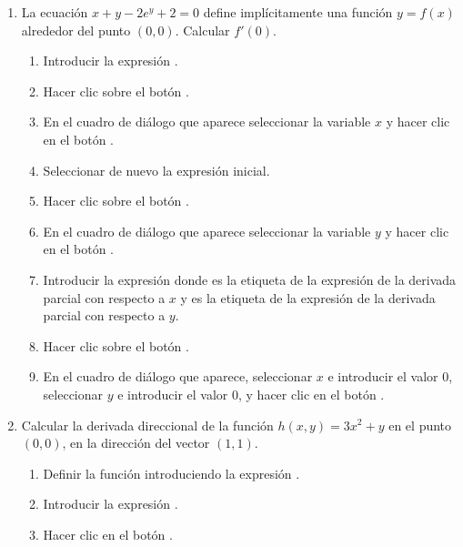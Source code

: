 \begin{enumerate}[leftmargin=*]
\item La ecuación $x+y-2e^y+2=0$ define implícitamente una función $y=f(x)$ alrededor del punto $(0,0)$. Calcular
$f'(0)$.
\begin{indicacion}
{\begin{enumerate}
\item Introducir la expresión .
\item Hacer clic sobre el botón .
\item En el cuadro de diálogo que aparece seleccionar la variable $x$ y hacer clic en el botón . 
\item Seleccionar de nuevo la expresión inicial.
\item Hacer clic sobre el botón .
\item En el cuadro de diálogo que aparece seleccionar la variable $y$ y hacer clic en el botón .
\item Introducir la expresión  donde  es la etiqueta de la expresión de la derivada
parcial con respecto a $x$ y  es la etiqueta de la expresión de la derivada parcial con respecto a $y$.
\item Hacer clic sobre el botón .
\item En el cuadro de diálogo que aparece, seleccionar $x$ e introducir el valor $0$, seleccionar $y$ e
introducir el valor $0$, y hacer clic en el botón .
\end{enumerate}
}
\end{indicacion}

\item Calcular la derivada direccional de la función $h(x,y)= 3x^2+y$ en el punto $(0,0)$, en la dirección del vector
$(1,1)$.
\begin{indicacion}
{\begin{enumerate}
\item Definir la función introduciendo la expresión .
\item Introducir la expresión .
\item Hacer clic en el botón .
\end{enumerate}
}
\end{indicacion}


\end{enumerate}
